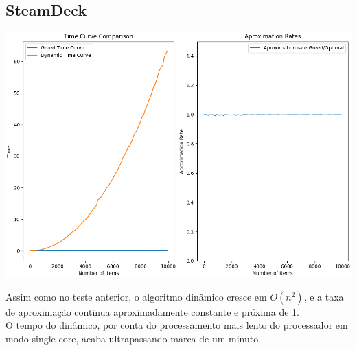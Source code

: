 \documentclass{article}
\begin{document}
    \subsection{SteamDeck}
        \includegraphics[scale = 0.45]{images/Figure_2.png}\label{SteamDeck execution}
        
        Assim como no teste anterior, o algoritmo dinâmico cresce em $O(n^2)$, e a taxa de aproximação continua aproximadamente constante e próxima de 1.\\
        O tempo do dinâmico, por conta do processamento mais lento do processador em modo single core, acaba ultrapassando marca de um minuto.\\
\end{document}
